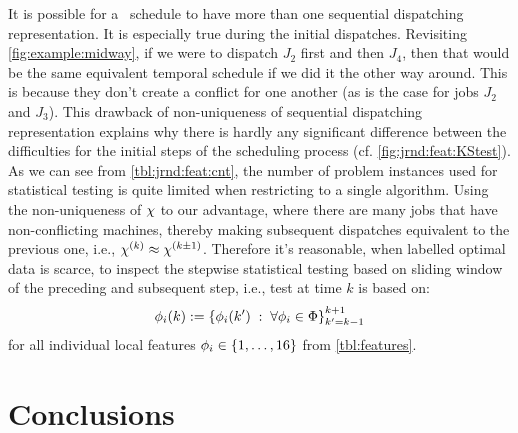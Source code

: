 It is possible for a \JSP\ schedule to have more than one sequential 
dispatching representation. It is especially true during the initial 
dispatches. 
Revisiting \cref{fig:example:midway}, if we were to dispatch $J_2$ 
first and then $J_4$, then that would be the same equivalent
temporal schedule if we did it the other way around. 
This is because they don't create a conflict for one another 
(as is the case for jobs $J_2$ and $J_3$). 
This drawback of non-uniqueness of sequential dispatching representation 
explains why there is hardly any significant difference between the 
difficulties for the initial steps of the scheduling process (cf. 
\cref{fig:jrnd:feat:KStest}).
As we can see from \cref{tbl:jrnd:feat:cnt}, the number of problem instances 
used for statistical testing is quite limited when restricting to a single 
algorithm. 
Using the non-uniqueness of ${\mathbf{\chi}}$ to our advantage, where there are many jobs 
that have non-conflicting machines, thereby making subsequent dispatches 
equivalent to the previous one, i.e., ${\mathbf{\chi}}^{(k)} \approx  {\mathbf{\chi}}^{(k\pm1)}$. 
Therefore it's reasonable, when labelled optimal data is scarce, to inspect the 
stepwise statistical testing based on sliding window of the preceding and 
subsequent step, i.e., test at time $k$ is based on: 
\begin{equation}
{\mathbf{\phi}}_i(k) := \left\{\phi_i(k')\;:\;\forall \phi_i\in\Phi\right\}_{k'=k-1}^{k+1} 
\end{equation}
for all individual local features $\phi_i\in\{1,\ldots,16\}$ from 
\cref{tbl:features}.

\section{Conclusions}

